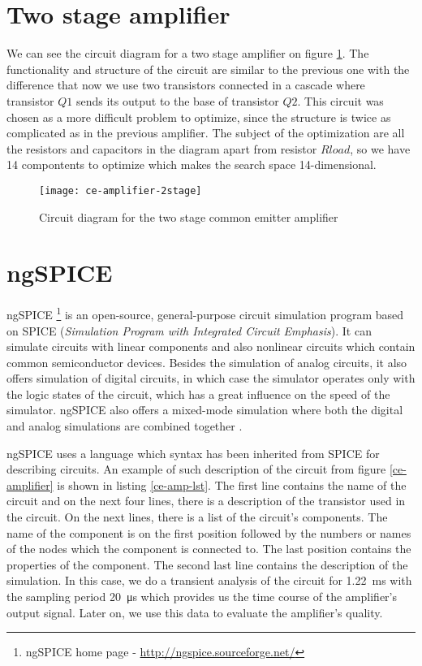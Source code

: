 \section{Two stage amplifier}
We can see the circuit diagram for a two stage amplifier on figure \ref{ce-amplifier-2stage}. The functionality and structure of the circuit are similar to the previous one with the difference that now we use two transistors connected in a cascade where transistor $Q1$ sends its output to the base of transistor $Q2$. This circuit was chosen as a more difficult problem to optimize, since the structure is twice as complicated as in the previous amplifier. The subject of the optimization are all the resistors and capacitors in the diagram apart from resistor $Rload$, so we have 14 compontents to optimize which makes the search space 14-dimensional.

\begin{figure}[H]
    \centering
    \texttt{[image: ce-amplifier-2stage]} \label{ce-amplifier-2stage}
    \caption{Circuit diagram for the two stage common emitter amplifier}
\end{figure}

\section{ngSPICE}
ngSPICE \footnote{ngSPICE home page - \url{http://ngspice.sourceforge.net/}} is an open-source, general-purpose circuit simulation program based on SPICE (\textit{Simulation Program with Integrated Circuit Emphasis}). It can simulate circuits with linear components and also nonlinear circuits which contain common semiconductor devices. Besides the simulation of analog circuits, it also offers simulation of digital circuits, in which case the simulator operates only with the logic states of the circuit, which has a great influence on the speed of the simulator. ngSPICE also offers a mixed-mode simulation where both the digital and analog simulations are combined together \cite{ngSPICE-manual}.

ngSPICE uses a language which syntax has been inherited from SPICE for describing circuits. An example of such description of the circuit from figure \ref{ce-amplifier} is shown in listing \ref{ce-amp-lst}. The first line contains the name of the circuit and on the next four lines, there is a description of the transistor used in the circuit. On the next lines, there is a list of the circuit's components. The name of the component is on the first position followed by the numbers or names of the nodes which the component is connected to. The last position contains the properties of the component. The second last line contains the description of the simulation. In this case, we do a transient analysis of the circuit for \SI{1.22}{\milli\second} with the sampling period \SI{20}{\micro\second} which provides us the time course of the amplifier's output signal. Later on, we use this data to evaluate the amplifier's quality.

